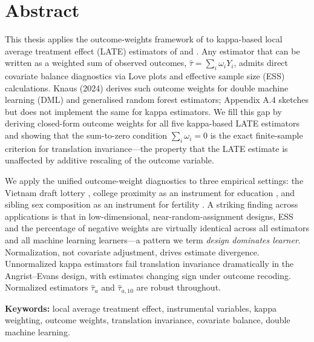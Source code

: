 \documentclass[12pt, a4paper, oneside]{article}
\theoremstyle{plain}
\theoremstyle{definition}
\begin{document}

\newpage
\section*{Abstract}

This thesis applies the outcome-weights framework of \citet{knaus2024} to kappa-based
local average treatment effect (LATE) estimators of \citet{abadie2003} and
\citet{suw2025}. Any estimator that can be written as a weighted sum of observed outcomes,
$\hat\tau = \sum_i \omega_i Y_i$, admits direct covariate balance diagnostics via Love
plots and effective sample size (ESS) calculations. Knaus (2024) derives such outcome
weights for double machine learning (DML) and generalised random forest estimators;
Appendix A.4 sketches but does not implement the same for kappa estimators. We fill
this gap by deriving closed-form outcome weights for all five kappa-based LATE estimators
and showing that the sum-to-zero condition $\sum_i \omega_i = 0$ is the exact finite-sample
criterion for translation invariance---the property that the LATE estimate is unaffected
by additive rescaling of the outcome variable.

We apply the unified outcome-weight diagnostics to three empirical settings: the Vietnam
draft lottery \citep{angrist1990}, college proximity as an instrument for education
\citep{card1995}, and sibling sex composition as an instrument for fertility
\citep{angrist1998}. A striking finding across applications is that in low-dimensional,
near-random-assignment designs, ESS and the percentage of negative weights are virtually
identical across all estimators and all machine learning learners---a pattern we term
\emph{design dominates learner}. Normalization, not covariate adjustment, drives estimate
divergence. Unnormalized kappa estimators fail translation invariance dramatically in the
Angrist--Evans design, with estimates changing sign under outcome recoding. Normalized
estimators $\hat\tau_u$ and $\hat\tau_{a,10}$ are robust throughout.

\bigskip
\noindent\textbf{Keywords:} local average treatment effect, instrumental variables,
kappa weighting, outcome weights, translation invariance, covariate balance,
double machine learning.
\end{document}
